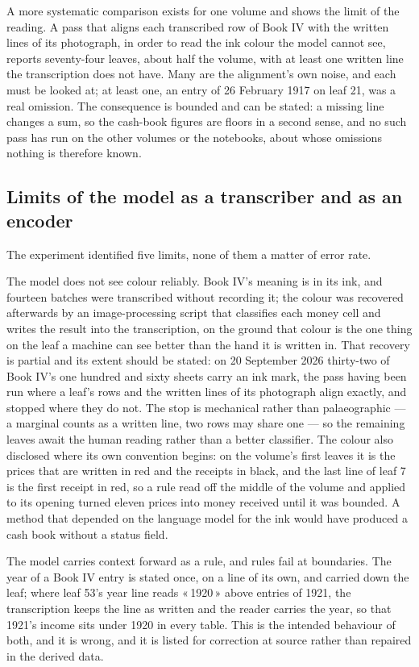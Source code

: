 \documentclass[11pt]{article}
\newcommand{\q}[1]{«\,#1\,»}
\begin{document}
A more systematic comparison exists for one volume and shows the limit of the reading. A pass that aligns each transcribed row of Book IV with the written lines of its photograph, in order to read the ink colour the model cannot see, reports seventy-four leaves, about half the volume, with at least one written line the transcription does not have. Many are the alignment's own noise, and each must be looked at; at least one, an entry of 26 February 1917 on leaf 21, was a real omission. The consequence is bounded and can be stated: a missing line changes a sum, so the cash-book figures are floors in a second sense, and no such pass has run on the other volumes or the notebooks, about whose omissions nothing is therefore known.

\subsection{Limits of the model as a transcriber and as an encoder}

The experiment identified five limits, none of them a matter of error rate.

The model does not see colour reliably. Book IV's meaning is in its ink, and fourteen batches were transcribed without recording it; the colour was recovered afterwards by an image-processing script that classifies each money cell and writes the result into the transcription, on the ground that colour is the one thing on the leaf a machine can see better than the hand it is written in. That recovery is partial and its extent should be stated: on 20 September 2026 thirty-two of Book IV's one hundred and sixty sheets carry an ink mark, the pass having been run where a leaf's rows and the written lines of its photograph align exactly, and stopped where they do not. The stop is mechanical rather than palaeographic — a marginal counts as a written line, two rows may share one — so the remaining leaves await the human reading rather than a better classifier. The colour also disclosed where its own convention begins: on the volume's first leaves it is the prices that are written in red and the receipts in black, and the last line of leaf 7 is the first receipt in red, so a rule read off the middle of the volume and applied to its opening turned eleven prices into money received until it was bounded. A method that depended on the language model for the ink would have produced a cash book without a status field.

The model carries context forward as a rule, and rules fail at boundaries. The year of a Book IV entry is stated once, on a line of its own, and carried down the leaf; where leaf 53's year line reads \q{1920} above entries of 1921, the transcription keeps the line as written and the reader carries the year, so that 1921's income sits under 1920 in every table. This is the intended behaviour of both, and it is wrong, and it is listed for correction at source rather than repaired in the derived data.
\end{document}
